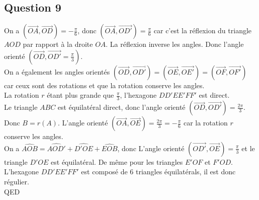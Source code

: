 \documentclass[]{book}
\theoremstyle{definition}
\begin{document}
\subsection*{Question 9}
On a $(\overrightarrow{OA},\overrightarrow{OD}) = -\frac{\pi}{6}$, donc $(\overrightarrow{OA},\overrightarrow{OD'}) = \frac{\pi}{6}$ car c'est la r\'eflexion du triangle $AOD$ par rapport \`a la droite $OA$. La r\'eflexion inverse les angles. Donc l'angle orient\'e $(\overrightarrow{OD},\overrightarrow{OD'} = \frac{\pi}{3})$.\\
On a \'egalement les angles orient\'es $(\overrightarrow{OD},\overrightarrow{OD'})=(\overrightarrow{OE},\overrightarrow{OE'})=(\overrightarrow{OF},\overrightarrow{OF'})$ car ceux sont des rotations et que la rotation conserve les angles.\\
La rotation $r$ \'etant plus grande que $\frac{\pi}{3}$, l'hexagone $DD'EE'FF'$ est direct.\\

Le triangle $ABC$ est \'equilat\'eral direct, donc l'angle orient\'e $(\overrightarrow{OD},\overrightarrow{OD'})= \frac{2\pi}{3}$. Donc $B=r(A)$. L'angle orient\'e $(\overrightarrow{OA},\overrightarrow{OE})= \frac{2\pi}{3} = -\frac{\pi}{6}$ car la rotation $r$ conserve les angles.\\
On a $\widehat{AOB} = \widehat{AOD'} + \widehat{D'OE} + \widehat{EOB}$, donc L'angle orient\'e $(\overrightarrow{OD'},\overrightarrow{OE})= \frac{\pi}{3}$ et le triangle $D'OE$ est \'equilat\'eral. De m\^eme pour les triangles $E'OF$ et $F'OD$.
L'hexagone $DD'EE'FF'$ est compos\'e de 6 triangles \'equilat\'erals, il est donc r\'egulier.\\

QED
\end{document}
